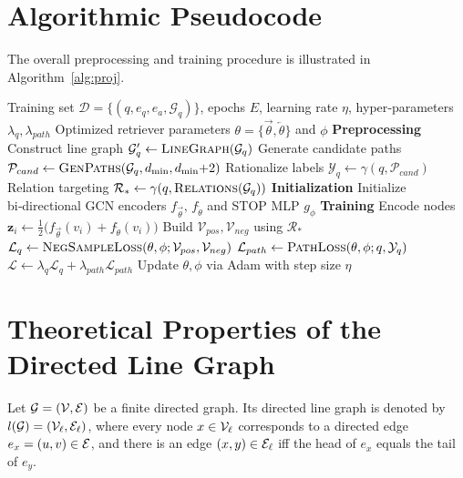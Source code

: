 \section{Algorithmic Pseudocode}
\label{pseudocode}
The overall preprocessing and training procedure is illustrated in Algorithm~\ref{alg:proj}.

\begin{algorithm}[t]
\caption{Overall Procedure of \proj}
\label{alg:proj}
\begin{algorithmic}[1]
\Require Training set $\mathcal{D}=\{(q,e_q,e_a,\mathcal{G}_q)\}$, epochs $E$, learning rate $\eta$, hyper‑parameters $\lambda_q,\lambda_{path}$
\Ensure  Optimized retriever parameters $\theta=\{\overrightarrow{\theta},\overleftarrow{\theta}\}$ and $\phi$
%
\Statex\textbf{Preprocessing}
    \State Construct line graph $\mathcal{G}'_q \gets \textsc{LineGraph}(\mathcal{G}_q)$
    \State Generate candidate paths $\mathcal{P}_{cand} \gets \textsc{GenPaths}(\mathcal{G}_q,d_{\min},d_{\min}{+}2)$
    \State Rationalize labels $\mathcal{Y}_q \gets \gamma(q,\mathcal{P}_{cand})$ 
    \State Relation targeting $\mathcal{R}_* \gets \gamma(q,\textsc{Relations}(\mathcal{G}_q))$ 
\EndFor
%
\Statex\textbf{Initialization}
\State Initialize bi‑directional GCN encoders $f_{\overrightarrow{\theta}},\,f_{\overleftarrow{\theta}}$ and STOP MLP $g_\phi$
%
\Statex\textbf{Training}
            \State Encode nodes $\mathbf{z}_i \gets 
            \tfrac12\!\bigl(f_{\overrightarrow{\theta}}(v_i)+
            f_{\overleftarrow{\theta}}(v_i)\bigr)$
            \State Build $\mathcal{V}_{pos},\mathcal{V}_{neg}$ using $\mathcal{R}_*$   
            \State $\mathcal{L}_q \gets \textsc{NegSampleLoss}(\theta,\phi;\mathcal{V}_{pos},\mathcal{V}_{neg})$ 
            \State $\mathcal{L}_{path} \gets \textsc{PathLoss}(\theta,\phi;q,\mathcal{Y}_q)$  
        \EndFor
        \State $\mathcal{L} \gets \lambda_q\mathcal{L}_q + \lambda_{path}\mathcal{L}_{path}$ 
        \State Update $\theta,\phi$ via Adam with step size $\eta$
    \EndFor
\EndFor
%
\end{algorithmic}
\end{algorithm}


\section{Theoretical Properties of the Directed Line Graph}
Let $\mathcal{G}=(\mathcal{V},\mathcal{E})$ be a finite directed graph.
Its directed line graph is denoted by $l(\mathcal{G})=(\mathcal{V}_{\ell},\mathcal{E}_{\ell})$,
where every node $x\in\mathcal{V}_{\ell}$ corresponds to a directed edge
$e_x=(u,v)\in\mathcal{E}$, and there is an edge $(x,y)\in\mathcal{E}_{\ell}$
iff the head of $e_x$ equals the tail of $e_y$.

